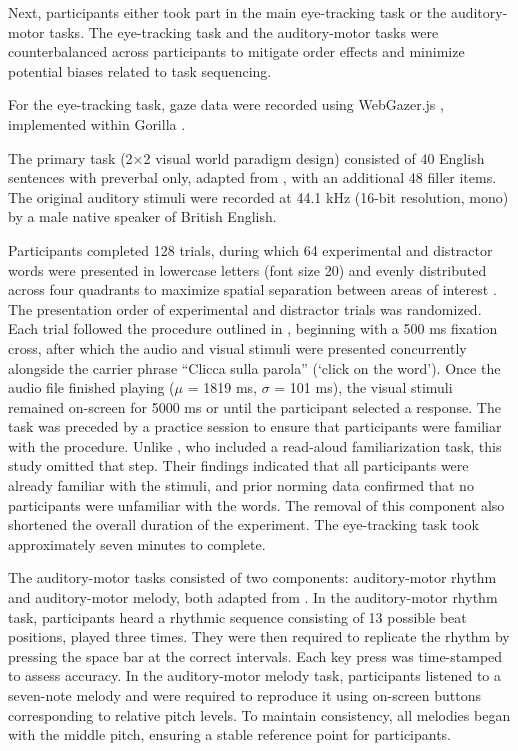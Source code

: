 Next, participants either took part in the main eye-tracking task or the auditory-motor tasks. The eye-tracking task and the auditory-motor tasks were counterbalanced across participants to mitigate order effects and minimize potential biases related to task sequencing.

For the eye-tracking task, gaze data were recorded using WebGazer.js \citep{Papoutsaki}, implemented within Gorilla \citep{Anwyl-Irvine_2019}. 

The primary task (2×2 visual world paradigm design) consisted of 40 English sentences with preverbal only, adapted from \cite{Ge_etal_2021}, with an additional 48 filler items. The original auditory stimuli were recorded at 44.1 kHz (16-bit resolution, mono) by a male native speaker of British English.

Participants completed 128 trials, during which 64 experimental and distractor words were presented in lowercase letters (font size 20) and evenly distributed across four quadrants to maximize spatial separation between areas of interest \citep{bramlett_wiener_24-AOW}. The presentation order of experimental and distractor trials was randomized. Each trial followed the procedure outlined in \cite{Ge_et_al}, beginning with a 500 ms fixation cross, after which the audio and visual stimuli were presented concurrently alongside the carrier phrase “Clicca sulla parola” (‘click on the word’). Once the audio file finished playing ($\mu$ = 1819 ms, $\sigma$ = 101 ms), the visual stimuli remained on-screen for 5000 ms or until the participant selected a response. The task was preceded by a practice session to ensure that participants were familiar with the procedure. Unlike \cite{Ge_et_al}, who included a read-aloud familiarization task, this study omitted that step. Their findings indicated that all participants were already familiar with the stimuli, and prior norming data confirmed that no participants were unfamiliar with the words. The removal of this component also shortened the overall duration of the experiment. The eye-tracking task took approximately seven minutes to complete.

The auditory-motor tasks consisted of two components: auditory-motor rhythm and auditory-motor melody, both adapted from \citep{Kachlicka_Saito_Tierney_2019}. In the auditory-motor rhythm task, participants heard a rhythmic sequence consisting of 13 possible beat positions, played three times. They were then required to replicate the rhythm by pressing the space bar at the correct intervals. Each key press was time-stamped to assess accuracy. In the auditory-motor melody task, participants listened to a seven-note melody and were required to reproduce it using on-screen buttons corresponding to relative pitch levels. To maintain consistency, all melodies began with the middle pitch, ensuring a stable reference point for participants.

